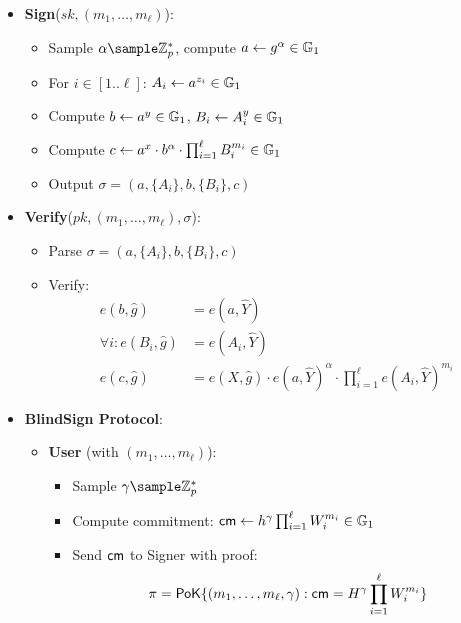 {\begin{itemize}
    \item \textbf{Sign}($sk, (m_1,\ldots,m_\ell)$):
    \begin{itemize}
        \item Sample $\alpha \sample \Z_p^*$, compute $a \gets g^\alpha \in \mathbb{G}_1$
        \item For $i \in [1..\ell]$: $A_i \gets a^{z_i} \in \mathbb{G}_1$
        \item Compute $b \gets a^y \in \mathbb{G}_1$, $B_i \gets A_i^y \in \mathbb{G}_1$
        \item Compute $c \gets a^{x} \cdot b^{\alpha} \cdot \prod_{i=1}^\ell B_i^{m_i} \in \mathbb{G}_1$
        \item Output $\sigma = (a, \{A_i\}, b, \{B_i\}, c)$
    \end{itemize}

    \item \textbf{Verify}($pk, (m_1,\ldots,m_\ell), \sigma$):
    \begin{itemize}
        \item Parse $\sigma = (a, \{A_i\}, b, \{B_i\}, c)$
        \item Verify:
            \begin{align*}
                e(b, \hat{g}) &= e(a, \widehat{Y}) \\
                \forall i: e(B_i, \hat{g}) &= e(A_i, \widehat{Y}) \\
                e(c, \hat{g}) &= e(X, \hat{g}) \cdot e(a, \widehat{Y})^\alpha \cdot \prod_{i=1}^\ell e(A_i, \widehat{Y})^{m_i}
            \end{align*}
    \end{itemize}

    \item \textbf{BlindSign Protocol}:
    \begin{itemize}
        \item \textbf{User} (with $(m_1, \ldots, m_\ell)$):
            \begin{itemize}
                \item Sample $\gamma \sample \Z_p^*$
                \item Compute commitment: $\mathsf{cm} \gets h^\gamma\prod_{i=1}^\ell W_i^{m_i} \in \mathbb{G}_1$
                \item Send $\mathsf{cm}$ to Signer with proof:
                    \[
                    \pi = \mathsf{PoK}\{(m_1, \ldots, m_\ell, \gamma): \mathsf{cm} = H^\gamma\prod_{i=1}^\ell W_i^{m_i}\}
                    \]
            \end{itemize}
        

\end{itemize}
\end{itemize}}
